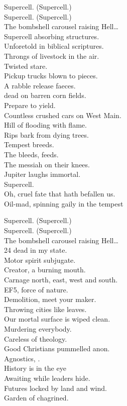 Supercell. (Supercell.) \\
Supercell. (Supercell.) \\
The bombshell carousel raising Hell… \\

Supercell absorbing structures. \\
Unforetold in biblical scriptures. \\
Throngs of livestock in the air. \\
Twisted stare. \\
Pickup trucks blown to pieces. \\
A rabble release faeces. \\
 dead on barren corn fields. \\
Prepare to yield. \\

Countless crushed cars on West Main. \\
Hill of  flooding with flame. \\
Rips bark from dying trees. \\
Tempest breeds. \\
The  bleeds,  feeds. \\
The messiah on their knees. \\
Jupiter laughs immortal. \\
Supercell. \\

Oh, cruel fate that hath befallen us. \\
Oil-mad, spinning gaily in the tempest\

Supercell. (Supercell.) \\
Supercell. (Supercell.) \\
The bombshell carousel raising Hell… \\

24 dead in my state. \\
Motor spirit subjugate. \\
Creator, a burning mouth. \\
Carnage north, east, west and south. \\
EF5, force of nature. \\
Demolition, meet your maker. \\
Throwing cities like leaves. \\
Our mortal surface is wiped clean. \\

Murdering everybody. \\
Careless of theology. \\
Good Christians pummelled anon. \\
Agnostics, . \\
History is in the eye \\
Awaiting  while leaders hide. \\
Futures locked by land and wind. \\
Garden of  chagrined. \\

